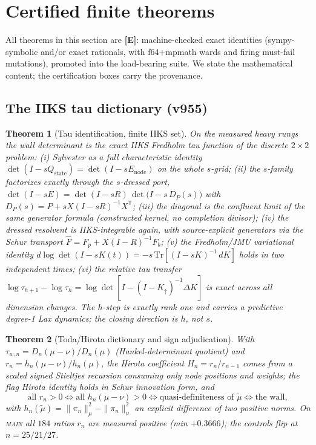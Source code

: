 \documentclass[11pt]{article}
\newcommand{\mE}{\textcolor{certgreen}{\textbf{[E]}}}
\newtheorem{theorem}{Theorem}[section]
\theoremstyle{definition}
\theoremstyle{remark}
\newcommand{\mut}{\tilde\mu}
\begin{document}
\section{Certified finite theorems}\label{sec:certified}

All theorems in this section are \mE: machine-checked exact identities
(sympy-symbolic and/or exact rationals, with f64+mpmath wards and firing
must-fail mutations), promoted into the load-bearing suite.  We state the
mathematical content; the certification boxes carry the provenance.

\subsection{The IIKS tau dictionary (v955)}

\begin{theorem}[Tau identification, finite IIKS set]\label{thm:v955}
On the measured heavy rungs the wall determinant is the exact IIKS Fredholm
tau function of the discrete $2\times2$ problem:
(i) Sylvester as a full characteristic identity
$\det(I-sQ_{\mathrm{state}})=\det(I-sE_{\mathrm{node}})$ on the whole
$s$-grid;
(ii) the $s$-family factorizes exactly through the $s$-dressed port,
$\det(I-sE)=\det(I-sR)\,\det\!\bigl(I-s\,D_P(s)\bigr)$ with
$D_P(s)=P+sX(I-sR)^{-1}X^{\mathsf T}$;
(iii) the diagonal is the confluent limit of the same generator formula
(constructed kernel, no completion divisor);
(iv) the dressed resolvent is IIKS-integrable again, with source-explicit
generators via the Schur transport $\hat F=F_p+X(I-R)^{-1}F_b$;
(v) the Fredholm/JMU variational identity
$d\log\det(I-sK(t))=-s\,\mathrm{Tr}[(I-sK)^{-1}\,dK]$ holds in two
independent times;
(vi) the relative tau transfer
$\log\tau_{h+1}-\log\tau_h=\log\det[I-(I-K_\uparrow)^{-1}\Delta K]$ is
exact across all dimension changes.
The $h$-step is exactly rank one and carries a predictive degree-1 Lax
dynamics; the closing direction is $h$, not $s$.
\end{theorem}

\begin{theorem}[Toda/Hirota dictionary and sign adjudication]\label{thm:v955b}
With $\tau_{w,n}=D_n(\mu-\nu)/D_n(\mu)$ (Hankel-determinant quotient) and
$r_n=h_n(\mu-\nu)/h_n(\mu)$, the Hirota coefficient
$H_n=r_n/r_{n-1}$ comes from a scaled signed Stieltjes recursion consuming
only node positions and weights; the flag Hirota identity holds in Schur
innovation form, and
\[
\text{all } r_n>0 \iff \text{all } h_n(\mu-\nu)>0 \iff
\text{quasi-definiteness of } \mut \iff \text{the wall},
\]
with $h_n(\mut)=\|\pi_n\|_\mu^2-\|\pi_n\|_\nu^2$ an explicit difference of
two positive norms.  On \textsc{main} all $184$ ratios $r_n$ are measured
positive (min $+0.3666$); the controls flip at $n=25/21/27$.
\end{theorem}
\end{document}
